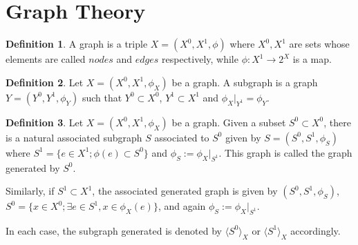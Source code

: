 \documentclass[]{article}
\theoremstyle{definition}
\newtheorem{definition}{Definition}[section]
\theoremstyle{definition}
\newcommand{\raw}{\rightarrow}
\begin{document}
	
	\section{Graph Theory}
	
	\begin{definition}
		A graph is a triple $X=(X^0, X^1, \phi)$ where $X^0, X^1$ are sets whose elements are called $nodes$ and $edges$ respectively, while $\phi:X^1 \raw 2^X$ is a map. 
	\end{definition}
	
	\begin{definition}
		Let $X=(X^0, X^1, \phi_X)$ be a graph. A subgraph is a graph $Y=(Y^0, Y^1, \phi_Y)$ such that $Y^0\subset X^0$, $Y^1\subset X^1$ and $\phi_X|_{Y^1}=\phi_Y$.
	\end{definition}
	
	\begin{definition}
		Let $X=(X^0, X^1, \phi_X)$ be a graph.	Given a subset $S^0 \subset X^0$, there is a natural associated subgraph $S$ associated to $S^0$ given by $S=(S^0, S^1, \phi_S)$ where $S^1=\{e \in X^1; \phi(e)\subset S^0 \}$ and $\phi_S := \phi_X|_{S^1}$. This graph is called the graph generated by $S^0$. 
		
		Similarly, if $S^1 \subset X^1$, the associated generated graph is given by $(S^0, S^1, \phi_S)$, $S^0=\{x \in X^0; \exists e \in S^1, x \in \phi_X(e)\}$, and again $\phi_S:=\phi_X|_{S^1}$.
		
		In each case, the subgraph generated is denoted by $\langle S^0 \rangle_X$ or $\langle S^1 \rangle_X$ accordingly.
	\end{definition}
	
\end{document}
